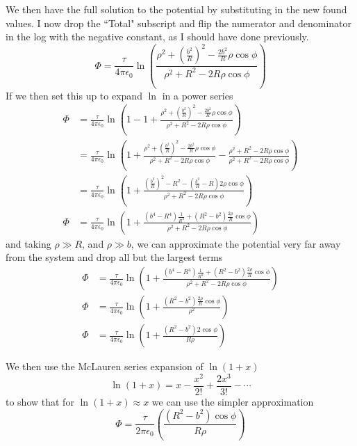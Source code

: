 \documentclass{article}
\begin{document}
We then have the full solution to the potential by substituting in the new found values. I now drop the ``Total" subscript and flip the numerator and denominator in the log with the negative constant, as I should have done previously.
\[ \Phi = \boxed{\frac{\tau}{4\pi\epsilon_{0}}\ln\left(\frac{\rho^{2} + (\frac{b^{2}}{R})^{2} - \frac{2b^{2}}{R}\rho\cos\phi}{\rho^{2} + R^{2} - 2R\rho\cos\phi}\right)} \]
If we then set this up to expand $\ln$ in a power series
\begin{align*}
\Phi &= \frac{\tau}{4\pi\epsilon_{0}}\ln\left(1-1+\frac{\rho^{2} + (\frac{b^{2}}{R})^{2} - \frac{2b^{2}}{R}\rho\cos\phi}{\rho^{2} + R^{2} - 2R\rho\cos\phi}\right)\\
&= \frac{\tau}{4\pi\epsilon_{0}}\ln\left(1+\frac{\rho^{2} + (\frac{b^{2}}{R})^{2} - \frac{2b^{2}}{R}\rho\cos\phi}{\rho^{2} + R^{2} - 2R\rho\cos\phi} - \frac{\rho^{2} + R^{2} - 2R\rho\cos\phi}{\rho^{2} + R^{2} - 2R\rho\cos\phi}\right)\\
&= \frac{\tau}{4\pi\epsilon_{0}}\ln\left(1+ \frac{(\frac{b^{2}}{R})^{2} - R^{2} - \left( \frac{b^{2}}{R} - R \right)2\rho\cos\phi}{\rho^{2} + R^{2} - 2R\rho\cos\phi}\right)\\
\Phi &= \frac{\tau}{4\pi\epsilon_{0}}\ln\left(1+ \frac{(b^{4} - R^{4})\frac{1}{R^{2}} + (R^{2}-b^{2})\frac{2\rho}{R}\cos\phi}{\rho^{2} + R^{2} - 2R\rho\cos\phi}\right)
\end{align*}
and taking $\rho\gg R$, and $\rho\gg b$, we can approximate the potential very far away from the system and drop all but the largest terms
\begin{align*}
\Phi &= \frac{\tau}{4\pi\epsilon_{0}}\ln\left(1+ \frac{(b^{4} - R^{4})\frac{1}{R^{2}} + (R^{2}-b^{2})\frac{2\rho}{R}\cos\phi}{\rho^{2} + R^{2} - 2R\rho\cos\phi}\right)\\
\Phi &= \frac{\tau}{4\pi\epsilon_{0}}\ln\left(1+ \frac{(R^{2}-b^{2})\frac{2\rho}{R}\cos\phi}{\rho^{2}}\right)\\
\Phi &= \frac{\tau}{4\pi\epsilon_{0}}\ln\left(1+ \frac{(R^{2}-b^{2})2\cos\phi}{R\rho}\right)
\end{align*}

We then use the McLauren series expansion of $\ln(1+x)$
\[ \ln(1+x) = x - \frac{x^2}{2!} + \frac{2x^3}{3!} - \cdots \]
to show that for $\ln(1+x)\approx x$ we can use the simpler approximation
\[ \Phi = \boxed{\frac{\tau}{2\pi\epsilon_{0}}\left( \frac{(R^{2}-b^{2})\cos\phi}{R\rho} \right)} \]
\end{document}
